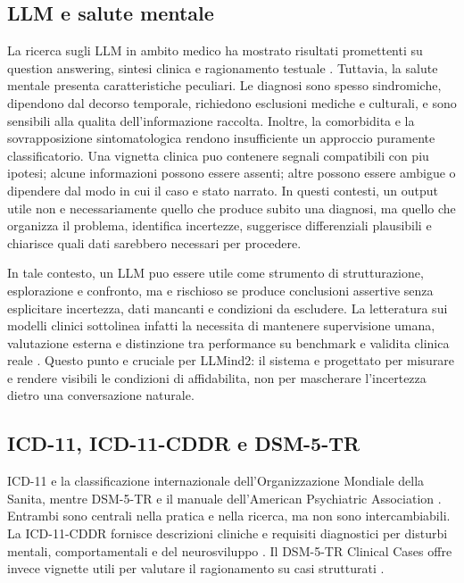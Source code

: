 \documentclass[11pt,a4paper]{article}
\newcommand{\llmind}{LLMind2}
\begin{document}
\subsection{LLM e salute mentale}
La ricerca sugli LLM in ambito medico ha mostrato risultati promettenti su question answering, sintesi clinica e ragionamento testuale \citep{singhal2023medpalm,peng2023medical}. Tuttavia, la salute mentale presenta caratteristiche peculiari. Le diagnosi sono spesso sindromiche, dipendono dal decorso temporale, richiedono esclusioni mediche e culturali, e sono sensibili alla qualita dell'informazione raccolta. Inoltre, la comorbidita e la sovrapposizione sintomatologica rendono insufficiente un approccio puramente classificatorio. Una vignetta clinica puo contenere segnali compatibili con piu ipotesi; alcune informazioni possono essere assenti; altre possono essere ambigue o dipendere dal modo in cui il caso e stato narrato. In questi contesti, un output utile non e necessariamente quello che produce subito una diagnosi, ma quello che organizza il problema, identifica incertezze, suggerisce differenziali plausibili e chiarisce quali dati sarebbero necessari per procedere.

In tale contesto, un LLM puo essere utile come strumento di strutturazione, esplorazione e confronto, ma e rischioso se produce conclusioni assertive senza esplicitare incertezza, dati mancanti e condizioni da escludere. La letteratura sui modelli clinici sottolinea infatti la necessita di mantenere supervisione umana, valutazione esterna e distinzione tra performance su benchmark e validita clinica reale \citep{singhal2023medpalm}. Questo punto e cruciale per \llmind: il sistema e progettato per misurare e rendere visibili le condizioni di affidabilita, non per mascherare l'incertezza dietro una conversazione naturale.

\subsection{ICD-11, ICD-11-CDDR e DSM-5-TR}
ICD-11 e la classificazione internazionale dell'Organizzazione Mondiale della Sanita, mentre DSM-5-TR e il manuale dell'American Psychiatric Association \citep{who2022icd11,apa2022dsm5tr}. Entrambi sono centrali nella pratica e nella ricerca, ma non sono intercambiabili. La ICD-11-CDDR fornisce descrizioni cliniche e requisiti diagnostici per disturbi mentali, comportamentali e del neurosviluppo \citep{who2024cddr}. Il DSM-5-TR Clinical Cases offre invece vignette utili per valutare il ragionamento su casi strutturati \citep{apa2023clinicalcases}.
\end{document}
